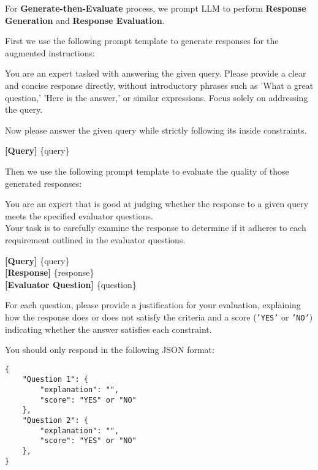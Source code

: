 \newpage

For \textbf{Generate-then-Evaluate} process, we prompt LLM to perform \textbf{Response Generation} and \textbf{Response Evaluation}.

First we use the following prompt template to generate responses for the augmented instructions:
\begin{tcolorbox}[title = {Prompt Template of Response Generation},breakable]
You are an expert tasked with answering the given query. Please provide a clear and concise response directly, without introductory phrases such as 'What a great question,' 'Here is the answer,' or similar expressions. Focus solely on addressing the query.

Now please answer the given query while strictly following its inside constraints.

\textbf{[Query]} \{query\}
\end{tcolorbox}

Then we use the following prompt template to evaluate the quality of those generated responses:
\begin{tcolorbox}[title = {Prompt Template of Response Evaluation}, breakable]
You are an expert that is good at judging whether the response to a given query meets the specified evaluator questions. \\
Your task is to carefully examine the response to determine if it adheres to each requirement outlined in the evaluator questions.

\textbf{[Query]} \{query\} \\
\textbf{[Response]} \{response\} \\
\textbf{[Evaluator Question]} \{question\}

For each question, please provide a justification for your evaluation, explaining how the response does or does not satisfy the criteria and a score (\texttt{'YES'} or \texttt{'NO'}) indicating whether the answer satisfies each constraint.

You should only respond in the following JSON format:
\begin{verbatim}
{
    "Question 1": {
        "explanation": "",
        "score": "YES" or "NO"
    },
    "Question 2": {
        "explanation": "",
        "score": "YES" or "NO"
    },
}
\end{verbatim}
\end{tcolorbox}


